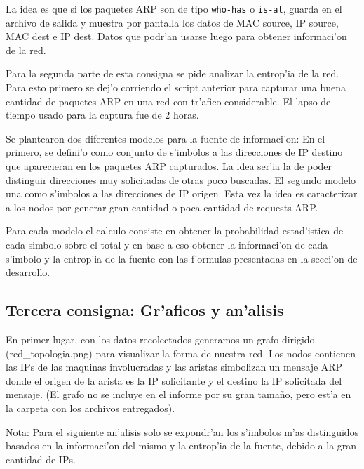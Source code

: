 \documentclass[a4paper,10pt]{article}
\begin{document}
La idea es que si los paquetes ARP son de tipo \texttt{who-has} o \texttt{is-at}, guarda en el archivo de salida y muestra por pantalla los datos de MAC source, IP source, MAC dest e IP dest. Datos que podr'an usarse luego para obtener informaci'on de la red.

\vspace*{5 mm}

Para la segunda parte de esta consigna se pide analizar la entrop'ia de la red. Para esto primero se dej'o corriendo el script anterior para capturar una buena cantidad de paquetes ARP en una red con tr'afico considerable. El lapso de tiempo usado para la captura fue de 2 horas. 

\vspace*{5 mm}

Se plantearon dos diferentes modelos para la fuente de informaci'on: En el primero, se defini'o como conjunto de s'imbolos a las direcciones de IP destino que aparecieran en los paquetes ARP capturados. La idea ser'ia la de poder distinguir direcciones muy solicitadas de otras poco buscadas. El segundo modelo una como s'imbolos a las direcciones de IP origen. Esta vez la idea es caracterizar a los nodos por generar gran cantidad o poca cantidad de requests ARP.

\vspace*{5 mm}

Para cada modelo el calculo consiste en obtener la probabilidad estad'istica de cada simbolo sobre el total y en base a eso obtener la informaci'on de cada s'imbolo y la entrop'ia de la fuente con las f'ormulas presentadas en la secci'on de desarrollo.

\subsection{Tercera consigna: Gr'aficos y an'alisis}
\label{expli1:}

En primer lugar, con los datos recolectados generamos un grafo dirigido (red\_topologia.png) para visualizar la forma de nuestra red. Los nodos contienen las IPs de las maquinas involucradas y las aristas simbolizan un mensaje ARP donde el origen de la arista es la IP solicitante y el destino la IP solicitada del mensaje. (El grafo no se incluye en el informe por su gran tama\~no, pero est'a en la carpeta con los archivos entregados).

Nota: Para el siguiente an'alisis solo se expondr'an los s'imbolos m'as distinguidos basados en la informaci'on del mismo y la entrop'ia de la fuente, debido a la gran cantidad de IPs. \\
\end{document}
